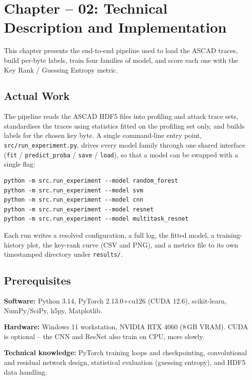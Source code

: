 \clearpage
\section[Technical Description and Implementation]{Chapter -- 02: Technical Description and Implementation}

This chapter presents the end-to-end pipeline used to load the ASCAD traces, build
per-byte labels, train four families of model, and score each one with the Key
Rank / Guessing Entropy metric.

\subsection{Actual Work}

The pipeline reads the ASCAD HDF5 files into profiling and attack trace sets,
standardises the traces using statistics fitted on the profiling set only, and builds
labels for the chosen key byte. A single command-line entry point,
\texttt{src/run\_experiment.py}, drives every model family through one shared
interface (\texttt{fit} / \texttt{predict\_proba} / \texttt{save} / \texttt{load}), so
that a model can be swapped with a single flag:

\begin{verbatim}
python -m src.run_experiment --model random_forest
python -m src.run_experiment --model svm
python -m src.run_experiment --model cnn
python -m src.run_experiment --model resnet
python -m src.run_experiment --model multitask_resnet
\end{verbatim}

Each run writes a resolved configuration, a full log, the fitted model, a
training-history plot, the key-rank curve (CSV and PNG), and a metrics file to its
own timestamped directory under \texttt{results/}.

\subsection{Prerequisites}

\noindent\textbf{Software:} Python 3.14, PyTorch 2.13.0+cu126 (CUDA 12.6), scikit-learn,
NumPy/SciPy, h5py, Matplotlib.

\noindent\textbf{Hardware:} Windows 11 workstation, NVIDIA RTX 4060 (8\,GB VRAM).
CUDA is optional -- the CNN and ResNet also train on CPU, more slowly.

\noindent\textbf{Technical knowledge:} PyTorch training loops and checkpointing,
convolutional and residual network design, statistical evaluation (guessing entropy),
and HDF5 data handling.

